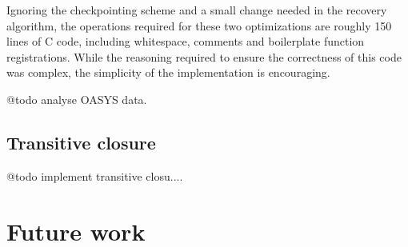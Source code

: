\documentclass[letterpaper,twocolumn,english]{article}
\begin{document}
Ignoring the checkpointing scheme and a small change needed in the
recovery algorithm, the operations required for these two
optimizations are roughly 150 lines of C code, including whitespace,
comments and boilerplate function registrations.  While the reasoning
required to ensure the correctness of this code was complex, the
simplicity of the implementation is encouraging.

@todo analyse OASYS data.

\subsection{Transitive closure}

@todo implement transitive closu....

%
%
%
%    
% 
%
%
%
%
%
%    
%
%

\section{Future work}
\end{document}
